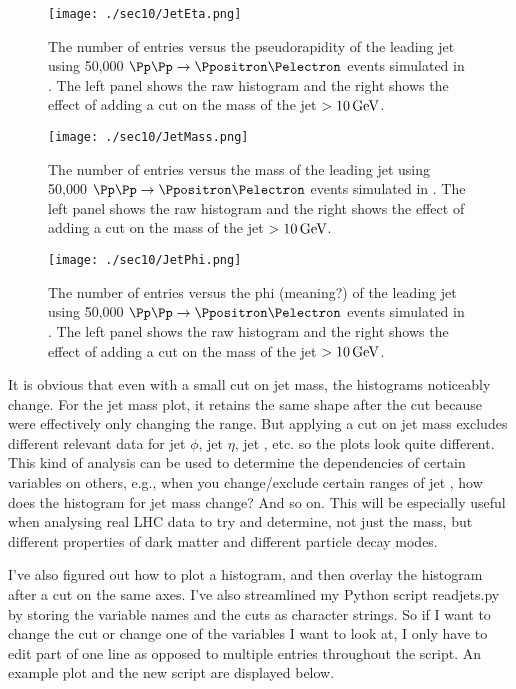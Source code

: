 \begin{figure}[htbp]
\centering
\texttt{[image: ./sec10/JetEta.png]}
\caption{The number of entries versus the pseudorapidity of the leading jet using 50,000 $\Pp\Pp \rightarrow \Ppositron \Pelectron$ events simulated in \madgraph. The left panel shows the raw histogram and the right shows the effect of adding a cut on the mass of the jet $>10\,\text{G\text{e\kern-0.15ex V}}$.}
\end{figure}

\begin{figure}[htbp]
\centering
\texttt{[image: ./sec10/JetMass.png]}
\caption{The number of entries versus the mass of the leading jet using 50,000 $\Pp\Pp \rightarrow \Ppositron \Pelectron$ events simulated in \madgraph. The left panel shows the raw histogram and the right shows the effect of adding a cut on the mass of the jet $>10\,\text{G\text{e\kern-0.15ex V}}$.}
\end{figure}

\begin{figure}[htbp]
\centering
\texttt{[image: ./sec10/JetPhi.png]}
\caption{The number of entries versus the phi (meaning?) of the leading jet using 50,000 $\Pp\Pp \rightarrow \Ppositron \Pelectron$ events simulated in \madgraph. The left panel shows the raw histogram and the right shows the effect of adding a cut on the mass of the jet $>10\,\text{G\text{e\kern-0.15ex V}}$.}
\end{figure}

It is obvious that even with a small cut on jet mass, the histograms noticeably change. For the jet mass plot, it retains the same shape after the cut because were effectively only changing the range. But applying a cut on jet mass excludes different relevant data for jet $\phi$, jet $\eta$, jet \pt, etc. so the plots look quite different. This kind of analysis can be used to determine the dependencies of certain variables on others, e.g., when you change/exclude certain ranges of jet \pt, how does the histogram for jet mass change? And so on. This will be especially useful when analysing real LHC data to try and determine, not just the mass, but different properties of dark matter and different particle decay modes.

I've also figured out how to plot a histogram, and then overlay the histogram after a cut on the same axes. I've also streamlined my Python script readjets.py by storing the variable names and the cuts as character strings. So if I want to change the cut or change one of the variables I want to look at, I only have to edit part of one line as opposed to multiple entries throughout the script. An example plot and the new script are displayed below.

